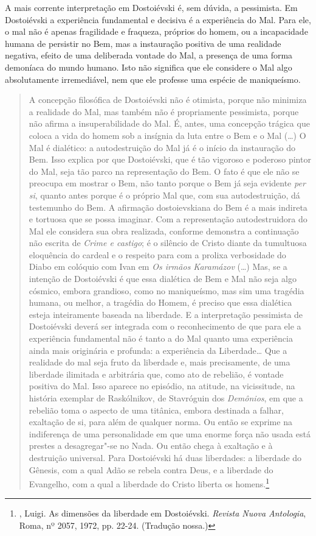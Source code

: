 A mais corrente interpretação em Dostoiévski é, sem dúvida, a
pessimista. Em Dostoiévski a experiência fundamental e decisiva é a
experiência do Mal. Para ele, o mal não é apenas fragilidade e fraqueza,
próprios do homem, ou a incapacidade humana de persistir no Bem, mas a
instauração positiva de uma realidade negativa, efeito de uma deliberada
vontade do Mal, a presença de uma forma demoníaca do mundo humano. Isto
não significa que ele considere o Mal algo absolutamente irremediável,
nem que ele professe uma espécie de maniqueísmo.

\begin{quotation}
A concepção filosófica de Dostoiévski não é otimista, porque não
minimiza a realidade do Mal, mas também não é propriamente pessimista,
porque não afirma a insuperabilidade do Mal. É, antes, uma concepção
trágica que coloca a vida do homem sob a insígnia da luta entre o Bem e
o Mal (\ldots{}) O Mal é dialético: a autodestruição do Mal já é o início da
instauração do Bem. Isso explica por que Dostoiévski, que é tão vigoroso
e poderoso pintor do Mal, seja tão parco na representação do Bem. O fato
é que ele não se preocupa em mostrar o Bem, não tanto porque o Bem já
seja evidente \emph{per si}, quanto antes porque é o próprio Mal que,
com sua autodestruição, dá testemunho do Bem. A afirmação
dostoievskiana do Bem é a mais indireta e tortuosa que se possa
imaginar. Com a representação autodestruidora do Mal ele considera sua
obra realizada, conforme demonstra a continuação não escrita de
\emph{Crime e castigo}; é o silêncio de Cristo diante da tumultuosa
eloquência do cardeal e o respeito para com a prolixa verbosidade do
Diabo em colóquio com Ivan em \emph{Os irmãos Karamázov} (\ldots{}) Mas, se a
intenção de Dostoiévski é que essa dialética de Bem e Mal não seja algo
cósmico, embora grandioso, como no maniqueísmo, mas sim uma tragédia
humana, ou melhor, a tragédia do Homem, é preciso que essa dialética
esteja inteiramente baseada na liberdade. E a interpretação pessimista
de Dostoiévski deverá ser integrada com o reconhecimento de que para ele
a experiência fundamental não é tanto a do Mal quanto uma experiência
ainda mais originária e profunda: a experiência da Liberdade\ldots{} Que a
realidade do mal seja fruto da liberdade e, mais precisamente, de uma
liberdade ilimitada e arbitrária que, como ato de rebelião, é vontade
positiva do Mal. Isso aparece no episódio, na atitude, na vicissitude,
na história exemplar de Raskólnikov, de Stavróguin dos \emph{Demônios},
em que a rebelião toma o aspecto de uma titânica, embora destinada a
falhar, exaltação de si, para além de qualquer norma. Ou então se
exprime na indiferença de uma personalidade em que uma enorme força não
usada está prestes a desagregar"-se no Nada. Ou então chega à exaltação e
à destruição universal. Para Dostoiévski há duas liberdades: a liberdade
do Gênesis, com a qual Adão se rebela contra Deus, e a liberdade do
Evangelho, com a qual a liberdade do Cristo liberta os homens.\footnote{,
  Luigi. As dimensões da liberdade em Dostoiévski. \emph{Revista Nuova
  Antologia}, Roma, nº 2057, 1972, pp. 22-24. (Tradução nossa.)}
\end{quotation}

